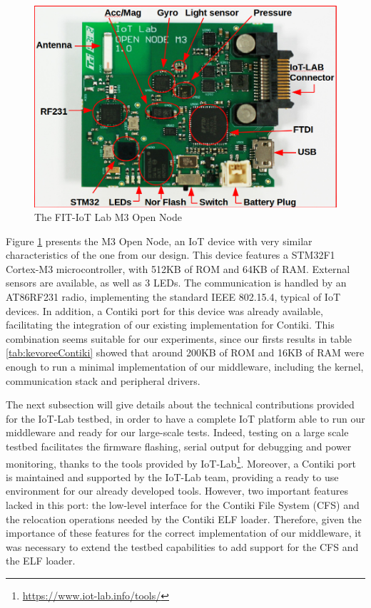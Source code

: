 \begin{figure}[htb]
	\centering
	\includegraphics[width=0.7\columnwidth]{chapters/modelsAtRuntimeContiki.images/m3opennode.png}
	\caption{The FIT-IoT Lab M3 Open Node} \label{fig:M3OpenNode}
\end{figure}

Figure \ref{fig:M3OpenNode} presents the M3 Open Node, an IoT device with very similar characteristics of the one from our design.
This device features a STM32F1 Cortex-M3 microcontroller, with 512KB of ROM and 64KB of RAM.
External sensors are available, as well as 3 LEDs.
The communication is handled by an AT86RF231 radio, implementing the standard IEEE 802.15.4, typical of IoT devices.
In addition, a Contiki port for this device was already available, facilitating the integration of our existing implementation for Contiki.
This combination seems suitable for our experiments, since our firsts results in table \ref{tab:kevoreeContiki} showed that around 200KB of ROM and 16KB of RAM were enough to run a minimal implementation of our middleware, including the kernel, communication stack and peripheral drivers.

The next subsection will give details about the technical contributions provided for the IoT-Lab testbed, in order to have a complete IoT platform able to run our middleware and ready for our large-scale tests.
Indeed, testing on a large scale testbed facilitates the firmware flashing, serial output for debugging and power monitoring, thanks to the tools provided by IoT-Lab\footnote{\url{https://www.iot-lab.info/tools/}}.
Moreover, a Contiki port is maintained and supported by the IoT-Lab team, providing a ready to use environment for our already developed tools.
However, two important features lacked in this port: the low-level interface for the Contiki File System (CFS) and the relocation operations needed by the Contiki ELF loader.
Therefore, given the importance of these features for the correct implementation of our middleware, it was necessary to extend the testbed capabilities to add support for the CFS and the ELF loader.


